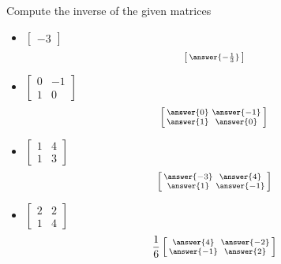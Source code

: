 \documentclass{ximera}
\begin{document}
\begin{exercise}
    Compute the inverse of the given matrices
    \begin{itemize}
        \item
        $\begin{bmatrix}
        -3
        \end{bmatrix}$
        \[
            \left[\begin{smallmatrix} \answer{-\frac{1}{3}} \end{smallmatrix}\right]
        \]
        \item
        $\begin{bmatrix}
        0 & -1 \\
        1 & 0
        \end{bmatrix}$
        \[
            \left[\begin{smallmatrix} \answer{0} & \answer{-1} \\ \answer{1} & \answer{0} \end{smallmatrix}\right]
        \]
        \item
        $\begin{bmatrix}
        1 & 4 \\
        1 & 3
        \end{bmatrix}$
        \[
            \left[\begin{smallmatrix} \answer{-3} & \answer{4} \\ \answer{1} & \answer{-1} \end{smallmatrix}\right]
        \]
        \item
        $\begin{bmatrix}
        2 & 2 \\
        1 & 4
        \end{bmatrix}$
        \[
            \frac{1}{6}\left[\begin{smallmatrix} \answer{4} & \answer{-2} \\ \answer{-1} & \answer{2} \end{smallmatrix}\right]
        \]
    \end{itemize}
\end{exercise}
\end{document}
